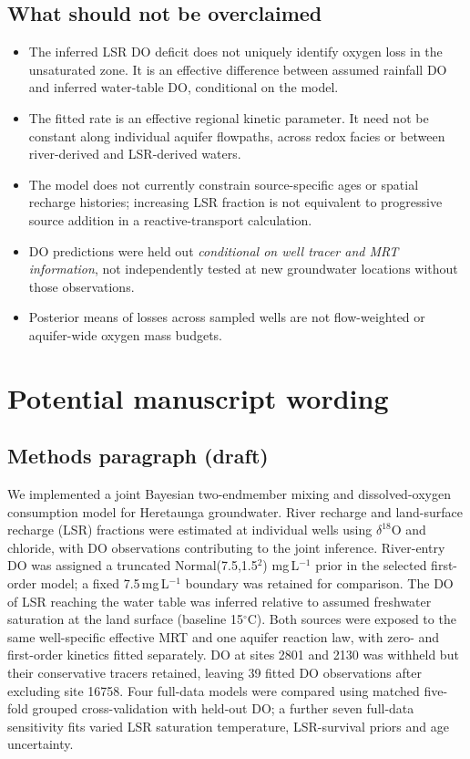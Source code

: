 \documentclass[11pt,a4paper]{article}
\begin{document}
\subsection{What should not be overclaimed}
\begin{itemize}
\item The inferred LSR DO deficit does not uniquely identify oxygen loss in the unsaturated zone. It is an effective difference between assumed rainfall DO and inferred water-table DO, conditional on the model.
\item The fitted rate is an effective regional kinetic parameter. It need not be constant along individual aquifer flowpaths, across redox facies or between river-derived and LSR-derived waters.
\item The model does not currently constrain source-specific ages or spatial recharge histories; increasing LSR fraction is not equivalent to progressive source addition in a reactive-transport calculation.
\item DO predictions were held out \emph{conditional on well tracer and MRT information}, not independently tested at new groundwater locations without those observations.
\item Posterior means of losses across sampled wells are not flow-weighted or aquifer-wide oxygen mass budgets.
\end{itemize}

\section{Potential manuscript wording}
\subsection*{Methods paragraph (draft)}
We implemented a joint Bayesian two-endmember mixing and dissolved-oxygen consumption model for Heretaunga groundwater. River recharge and land-surface recharge (LSR) fractions were estimated at individual wells using $\delta^{18}$O and chloride, with DO observations contributing to the joint inference. River-entry DO was assigned a truncated Normal(7.5,1.5$^2$) mg\,L$^{-1}$ prior in the selected first-order model; a fixed 7.5\,mg\,L$^{-1}$ boundary was retained for comparison. The DO of LSR reaching the water table was inferred relative to assumed freshwater saturation at the land surface (baseline 15$^\circ$C). Both sources were exposed to the same well-specific effective MRT and one aquifer reaction law, with zero- and first-order kinetics fitted separately. DO at sites 2801 and 2130 was withheld but their conservative tracers retained, leaving 39 fitted DO observations after excluding site 16758. Four full-data models were compared using matched five-fold grouped cross-validation with held-out DO; a further seven full-data sensitivity fits varied LSR saturation temperature, LSR-survival priors and age uncertainty.
\end{document}
